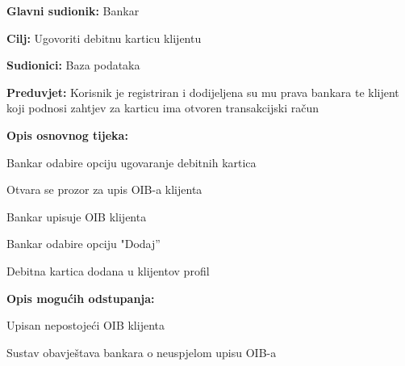 \noindent {}
\begin{packed_item}

  \item \textbf{Glavni sudionik: }Bankar
  \item  \textbf{Cilj:} Ugovoriti debitnu karticu klijentu
  \item  \textbf{Sudionici:} Baza podataka
  \item  \textbf{Preduvjet:} Korisnik je registriran i dodijeljena su mu prava bankara te klijent koji podnosi zahtjev za karticu ima otvoren transakcijski račun 
  \item  \textbf{Opis osnovnog tijeka:}
  
  \item[] \begin{packed_enum}

    \item Bankar odabire opciju ugovaranje debitnih kartica
    \item Otvara se prozor za upis OIB-a klijenta
    \item Bankar upisuje OIB klijenta
    \item Bankar odabire  opciju "Dodaj”
    \item Debitna kartica dodana u klijentov profil
  \end{packed_enum}
  
  \item  \textbf{Opis mogućih odstupanja:}
  
  \item[] \begin{packed_item}

    \item[2.a] Upisan nepostojeći OIB klijenta
    \item[] \begin{packed_enum}
      
      \item Sustav obavještava bankara o neuspjelom upisu OIB-a
      
    \end{packed_enum}
    
  \end{packed_item}
\end{packed_item}

